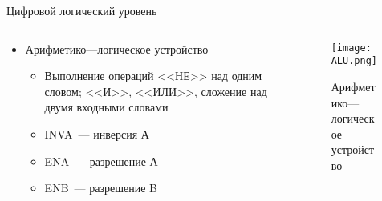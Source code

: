 \documentclass[aspectratio=169,14pt]{beamer}
\begin{document}
\begin{frame}{Цифровой логический уровень}
    \begin{columns}[T,onlytextwidth]
        \begin{column}{0.5\textwidth}
            \begin{itemize}
            \item Арифметико---логическое устройство
                \begin{itemize}
                    \item Выполнение операций <<НЕ>> над одним словом; <<И>>, <<ИЛИ>>, сложение над двумя входными словами
                    \item INVA~--- инверсия А
                    \item ENA~--- разрешение А
                    \item ENB~--- разрешение B
                \end{itemize}
            \end{itemize}
        \end{column}
        \begin{column}{0.5\textwidth}
            \begin{figure}[htp]
                \centering
                \texttt{[image: ALU.png]}
                \caption{\tiny{Арифметико---логическое устройство}}
            \end{figure}
        \end{column}
    \end{columns}
\end{frame}
\end{document}

